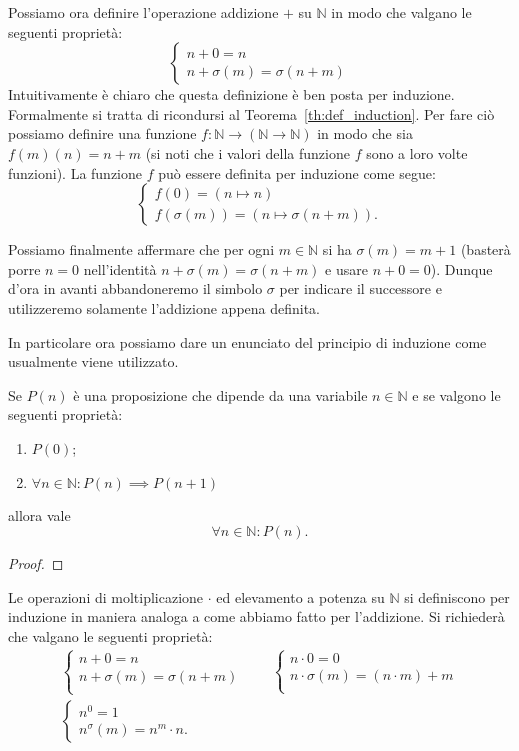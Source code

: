 \documentclass[italian,a4paper,twosides,headinclude]{scrbook}
\newcommand{\NN}{\mathbb N}
\begin{document}
Possiamo ora definire l'operazione addizione $+$ su $\NN$ in modo che valgano le seguenti proprietà:
\[
   \begin{cases}
     n + 0 = n \\
     n + \sigma(m) = \sigma(n+m)
   \end{cases}
\]
Intuitivamente è chiaro che questa definizione è ben posta per induzione.
Formalmente si tratta di ricondursi al
Teorema~\ref{th:def_induction}. Per fare ciò possiamo definire una funzione $f\colon \NN \to (\NN\to \NN)$ in modo che sia $f(m)(n) = n+m$ (si noti che i valori della funzione $f$ sono a loro volte funzioni). La funzione $f$ può essere definita
per induzione come segue:
\[
 \begin{cases}
 f(0) = (n\mapsto n)\\
 f(\sigma(m)) = (n\mapsto \sigma(n+m)).
 \end{cases}
\]

Possiamo finalmente affermare che per ogni $m\in \NN$ si ha $\sigma(m)=m+1$ (basterà porre $n=0$ nell'identità $n+\sigma(m)=\sigma(n+m)$ e usare $n+0=0$).
Dunque d'ora in avanti abbandoneremo il simbolo $\sigma$ per indicare il successore e utilizzeremo solamente l'addizione appena definita.

In particolare ora possiamo dare un enunciato del principio di induzione come usualmente viene utilizzato.

\begin{theorem}
Se $P(n)$ è una proposizione che dipende da una variabile $n\in \NN$ e se valgono le seguenti proprietà:
\begin{enumerate}
\item $P(0)$;
\item $\forall n\in \NN\colon P(n) \implies P(n+1)$
\end{enumerate}
allora vale
\[
  \forall n\in \NN \colon P(n).
\]
\end{theorem}
\begin{proof}

\end{proof}

Le operazioni di moltiplicazione $\cdot$ ed elevamento a potenza su $\NN$
si definiscono per induzione in maniera analoga a come abbiamo fatto per l'addizione.
Si richiederà che valgano le seguenti proprietà:
\begin{gather*}
   \begin{cases}
     n + 0 = n \\
     n + \sigma(m) = \sigma(n+m)\\
   \end{cases}
   \qquad
   \begin{cases}
     n \cdot 0 = 0\\
     n \cdot \sigma(m) = (n\cdot m) + m\\
   \end{cases}
   \\
   \begin{cases}
     n ^ 0 = 1\\
     n ^ \sigma(m) = n^m \cdot n.
   \end{cases}
\end{gather*}
\end{document}
